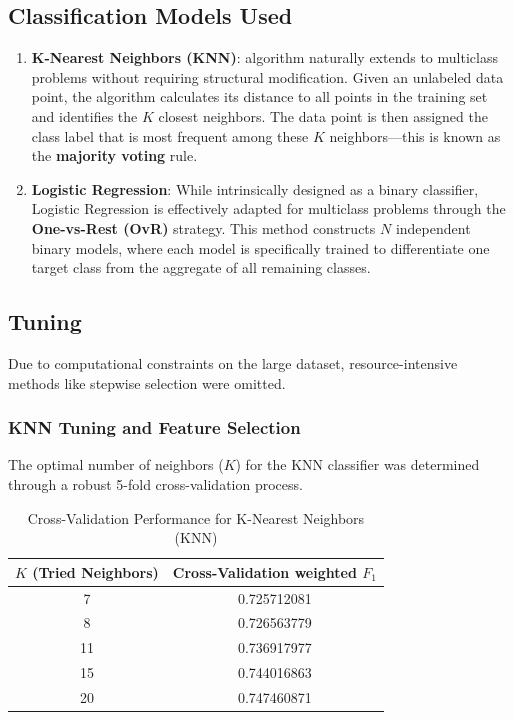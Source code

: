 \documentclass[conference]{IEEEtran}
\begin{document}
\subsection{\textbf{Classification Models Used}}

\begin{enumerate}
	\item \textbf{K-Nearest Neighbors (KNN)}: algorithm naturally extends to multiclass problems without requiring structural modification. Given an unlabeled data point, the algorithm calculates its distance to all points in the training set and identifies the $K$ closest neighbors. The data point is then assigned the class label that is most frequent among these $K$ neighbors—this is known as the \textbf{majority voting} rule.
	\item \textbf{Logistic Regression}: While intrinsically designed as a binary classifier, Logistic Regression is effectively adapted for multiclass problems through the \textbf{One-vs-Rest (OvR)} strategy. This method constructs $N$ independent binary models, where each model is specifically trained to differentiate one target class from the aggregate of all remaining classes.
\end{enumerate}

\subsection{\textbf{Tuning}}

\indent Due to computational constraints on the large dataset, resource-intensive methods like stepwise selection were omitted. \\

\subsubsection{\textbf{KNN Tuning and Feature Selection}} 

The optimal number of neighbors ($K$) for the KNN classifier was determined through a robust 5-fold cross-validation process.

\begin{table}[h]
	\centering
	\caption{Cross-Validation Performance for K-Nearest Neighbors (KNN)}
	\label{tab:knn_tuning}
	\begin{tabular}{| c | c |} %
		\hline %
		$K$ (Tried Neighbors) & Cross-Validation weighted $F_1$  \\
		\hline %
		7 & 0.725712081 \\
		8 & 0.726563779 \\
		11 & 0.736917977 \\
		15 & 0.744016863 \\
		20 & 0.747460871 \\
		\hline %
	\end{tabular}
\end{table}
\end{document}
